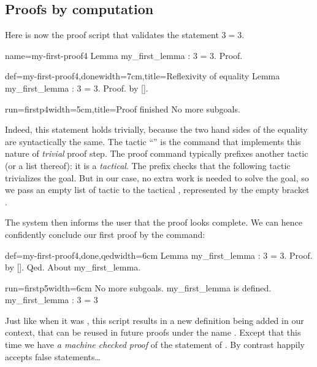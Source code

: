\subsection{Proofs by computation}\label{ssec:proofcomp}

Here is now the proof script that validates the statement $3 = 3$.

\begin{coqdef}{name=my-first-proof4}
Lemma my_first_lemma : 3 = 3.
Proof.
\end{coqdef}
\begin{coq}{def=my-first-proof4,done}{width=7cm,title=Reflexivity of equality}
Lemma my_first_lemma : 3 = 3.
Proof. by [].
\end{coq}
\begin{coqout}{run=firstp4}{width=5cm,title=Proof finished}
No more subgoals.
$~$
\end{coqout}

Indeed, this statement holds trivially, because the two hand sides of
the equality are syntactically the same. The tactic ``'' is
the command that
implements this nature of \emph{trivial} proof step. The proof command
 typically prefixes another tactic (or a list thereof): it is
a \emph{tactical}. The  prefix checks that the following tactic
trivializes the goal. But in our case, no extra work is needed to
solve the goal, so we pass an empty list of tactic to the tactical
, represented by the empty bracket \C{[]}.


The system then informs the user that the proof looks complete. We can hence
confidently conclude our first proof by the  command:

\begin{coq}{def=my-first-proof4,done,qed}{width=6cm}
Lemma my_first_lemma : 3 = 3.
Proof. by []. Qed.
About my_first_lemma.
\end{coq}
\begin{coqout}{run=firstp5}{width=6cm}
No more subgoals.
my_first_lemma is defined.
my_first_lemma : 3 = 3
\end{coqout}

Just like when it was , this script results in a new definition
being
added in our context, that can be reused in future proofs under
the name .
Except that this time we have \emph{a machine checked proof} of
the statement of .  By contrast
 happily accepts false statements\dots
{}

